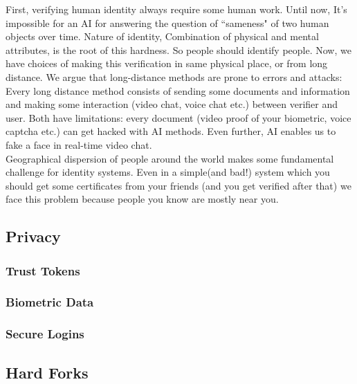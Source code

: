 \documentclass[conference]{IEEEtran}
\begin{document}
First, verifying human identity always require some human work. Until now, It's impossible for an AI for answering the question of ``sameness" of two human objects over time. Nature of identity, Combination of physical and mental attributes, is the root of this hardness. So people should identify people. Now, we have choices of making this verification in same physical place, or from long distance. We argue that long-distance methods are prone to errors and attacks: Every long distance method consists of sending some documents and information and making some interaction (video chat, voice chat etc.) between verifier and user. Both have limitations: every document (video proof of your biometric, voice captcha etc.) can get hacked with AI methods. Even further, AI enables us to fake a face in real-time video chat.
\\
Geographical dispersion of people around the world makes some fundamental challenge for identity systems. Even in a simple(and bad!) system which you should get some certificates from your friends (and you get verified after that) we face this problem because people you know are mostly near you. 



\subsection{Privacy}
\subsubsection*{Trust Tokens}
\subsubsection*{Biometric Data}
\subsubsection*{Secure Logins}

\subsection{Hard Forks}
\end{document}

